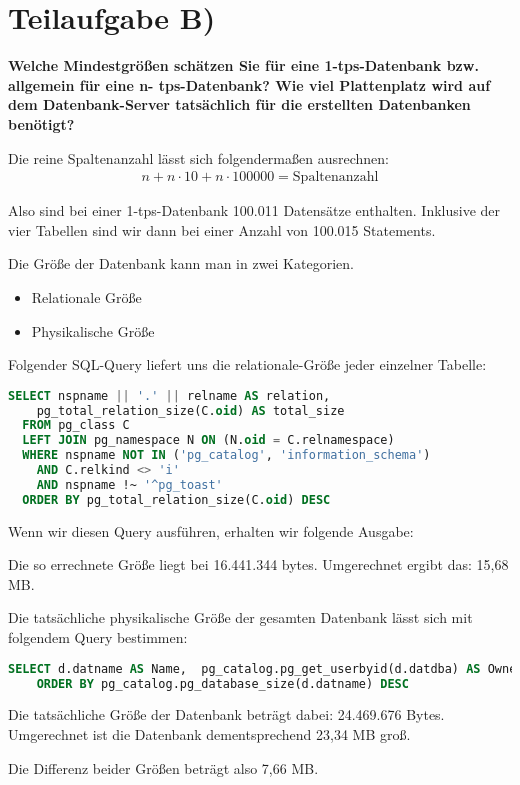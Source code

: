 \section{Teilaufgabe B)}
\textbf{Welche Mindestgrößen schätzen Sie für eine 1-tps-Datenbank bzw. allgemein für eine n-
tps-Datenbank? Wie viel Plattenplatz wird auf dem Datenbank-Server tatsächlich für die
erstellten Datenbanken benötigt?}

Die reine Spaltenanzahl lässt sich folgendermaßen ausrechnen:
\begin{eqnarray}
n + n \cdot 10 + n \cdot 100000 = \mbox{Spaltenanzahl}
\end{eqnarray}

Also sind bei einer 1-tps-Datenbank 100.011 Datensätze enthalten. Inklusive der
vier Tabellen sind wir dann bei einer Anzahl von 100.015 Statements.

Die Größe der Datenbank kann man in zwei Kategorien.
\begin{itemize}
  \item Relationale Größe
  \item Physikalische Größe
\end{itemize}

Folgender SQL-Query liefert uns die relationale-Größe jeder einzelner Tabelle:
\begin{lstlisting}[language=sql, caption={Größe der Tabelle und Datensätze
ermitteln}]
  SELECT nspname || '.' || relname AS relation,
    pg_total_relation_size(C.oid) AS total_size
  FROM pg_class C
  LEFT JOIN pg_namespace N ON (N.oid = C.relnamespace)
  WHERE nspname NOT IN ('pg_catalog', 'information_schema')
    AND C.relkind <> 'i'
    AND nspname !~ '^pg_toast'
  ORDER BY pg_total_relation_size(C.oid) DESC
\end{lstlisting}

Wenn wir diesen Query ausführen, erhalten wir folgende Ausgabe:

Die so errechnete Größe liegt bei 16.441.344 bytes. Umgerechnet ergibt das: 
15,68 MB.

Die tatsächliche physikalische Größe der gesamten Datenbank lässt sich mit
folgendem Query bestimmen:
\begin{lstlisting}[language=sql, caption={Physikalische Größe der Datenbank
ermitteln}]
SELECT d.datname AS Name,  pg_catalog.pg_get_userbyid(d.datdba) AS Owner, pg_catalog.pg_database_size(d.datname) AS SIZE FROM pg_catalog.pg_database d
    ORDER BY pg_catalog.pg_database_size(d.datname) DESC
\end{lstlisting}

Die tatsächliche Größe der Datenbank beträgt dabei: 24.469.676 Bytes.
Umgerechnet ist die Datenbank dementsprechend 23,34 MB groß.

Die Differenz beider Größen beträgt also 7,66 MB.
\clearpage